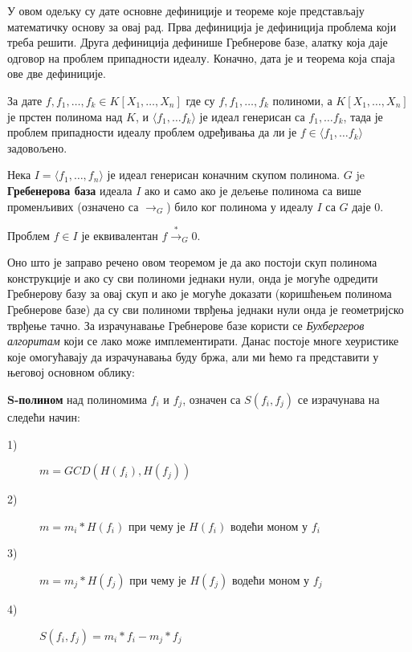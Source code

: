 У овом одељку су дате основне дефиниције и теореме које представљају
математичку основу за овај рад. Прва дефиниција је дефиниција проблема
који треба решити. Друга дефиниција дефинише Гребнерове базе, алатку
која даје одговор на проблем припадности идеалу. Коначно, дата је и
теорема која спаја ове две дефиниције.

\begin{definition}
  За дате $f, f_1, \ldots, f_k \in K[X_1, \ldots, X_n]$ где су $f,
  f_1, \ldots, f_k$ полиноми, а $K[X_1, \ldots, X_n]$ је прстен
  полинома над $K$, и $\langle f_1, \ldots f_k \rangle$ је идеал
  генерисан са $f_1, \ldots f_k$, тада је проблем припадности идеалу
  проблем одређивања да ли је $f \in \langle f_1, \ldots f_k \rangle$
  задовољено.
\end{definition}

\begin{definition}
  Нека $I = \langle f_1, \ldots, f_n \rangle$ је идеал генерисан
  коначним скупом полинома.  $G$ je \textbf{Гребенерова база} идеала
  $I$ ако и само ако је дељење полинома са више променљивих (означено
  са $\to_G$) било ког полинома у идеалу $I$ са $G$ даје 0.
\end{definition}

\begin{theorem}
Проблем $f \in I$ је еквивалентан $f \stackrel{*}{\to}_G 0$.
\end{theorem}

Оно што је заправо речено овом теоремом је да ако постоји скуп
полинома конструкције и ако су сви полиноми једнаки нули, онда је
могуће одредити Гребнерову базу за овај скуп и ако је могуће доказати
(коришћењем полинома Гребнерове базе) да су сви полиноми тврђења једнаки
нули онда је геометријско тврђење тачно. За израчунавање Гребнерове
базе користи се \emph{Бухбергеров алгоритам} који се лако може
имплементирати. Данас постоје многе хеуристике које омогућавају да
израчунавања буду бржа, али ми ћемо га представити у његовој основном
облику:

\begin{definition}
\textbf{S-полином} над полиномима $f_i$ и $f_j$, означен са $S(f_i,
f_j)$ се израчунава на следећи начин:
\begin{description}
\item[1)] $m = GCD(H(f_i), H(f_j))$ 
\item[2)] $m = m_i * H(f_i)$ при чему је $H(f_i)$ водећи моном у $f_i$ 
\item[3)] $m = m_j * H(f_j)$  при чему је $H(f_j)$ водећи моном у $f_j$
\item[4)] $S(f_i, f_j) = m_i*f_i - m_j*f_j$ 
\end{description}
\end{definition}

